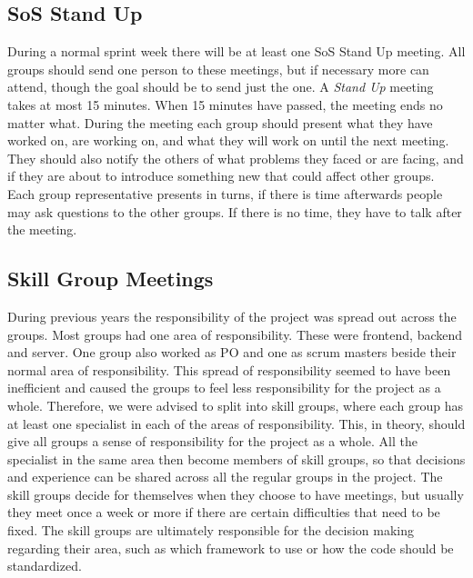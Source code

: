 \subsection{SoS Stand Up}
During a normal sprint week there will be at least one SoS Stand Up meeting.
All groups should send one person to these meetings, but if necessary more can attend, though the goal should be to send just the one.
A \textit{Stand Up} meeting takes at most 15 minutes.
When 15 minutes have passed, the meeting ends no matter what.
\newline
\newline
During the meeting each group should present what they have worked on, are working on, and what they will work on until the next meeting.
They should also notify the others of what problems they faced or are facing, and if they are about to introduce something new that could affect other groups.
Each group representative presents in turns, if there is time afterwards people may ask questions to the other groups.
If there is no time, they have to talk after the meeting.


\subsection{Skill Group Meetings}
During previous years the responsibility of the project was spread out across the groups.
Most groups had one area of responsibility.
These were frontend, backend and server.
One group also worked as PO and one as scrum masters beside their normal area of responsibility.
This spread of responsibility seemed to have been inefficient and caused the groups to feel less responsibility for the project as a whole.
\newline
\newline
Therefore, we were advised to split into skill groups, where each group has at least one specialist in each of the areas of responsibility.
This, in theory, should give all groups a sense of responsibility for the project as a whole.
\newline
\newline
All the specialist in the same area then become members of skill groups, so that decisions and experience can be shared across all the regular groups in the project.
The skill groups decide for themselves when they choose to have meetings, but usually they meet once a week or more if there are certain difficulties that need to be fixed.
The skill groups are ultimately responsible for the decision making regarding their area, such as which framework to use or how the code should be standardized.

